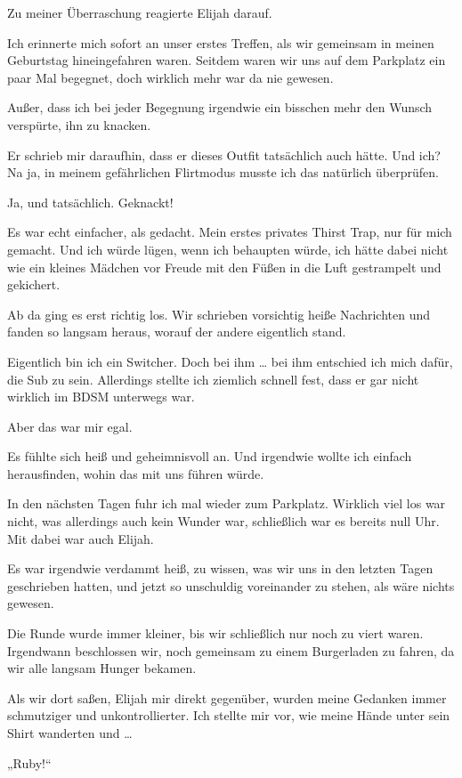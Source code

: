Zu meiner Überraschung reagierte Elijah darauf.

Ich erinnerte mich sofort an unser erstes Treffen, als wir gemeinsam in meinen Geburtstag hineingefahren waren. Seitdem waren wir uns auf dem Parkplatz ein paar Mal begegnet, doch wirklich mehr war da nie gewesen.

Außer, dass ich bei jeder Begegnung irgendwie ein bisschen mehr den Wunsch verspürte, ihn zu knacken.

Er schrieb mir daraufhin, dass er dieses Outfit tatsächlich auch hätte. Und ich? Na ja, in meinem gefährlichen Flirtmodus musste ich das natürlich überprüfen.

Ja, und tatsächlich. Geknackt!

Es war echt einfacher, als gedacht. Mein erstes privates Thirst Trap, nur für mich gemacht. Und ich würde lügen, wenn ich behaupten würde, ich hätte dabei nicht wie ein kleines Mädchen vor Freude mit den Füßen in die Luft gestrampelt und gekichert.

Ab da ging es erst richtig los. Wir schrieben vorsichtig heiße Nachrichten und fanden so langsam heraus, worauf der andere eigentlich stand.

Eigentlich bin ich ein Switcher. Doch bei ihm … bei ihm entschied ich mich dafür, die Sub zu sein. Allerdings stellte ich ziemlich schnell fest, dass er gar nicht wirklich im BDSM unterwegs war.

Aber das war mir egal.

Es fühlte sich heiß und geheimnisvoll an. Und irgendwie wollte ich einfach herausfinden, wohin das mit uns führen würde.


In den nächsten Tagen fuhr ich mal wieder zum Parkplatz. Wirklich viel los war nicht, was allerdings auch kein Wunder war, schließlich war es bereits null Uhr. Mit dabei war auch Elijah.

Es war irgendwie verdammt heiß, zu wissen, was wir uns in den letzten Tagen geschrieben hatten, und jetzt so unschuldig voreinander zu stehen, als wäre nichts gewesen.

Die Runde wurde immer kleiner, bis wir schließlich nur noch zu viert waren. Irgendwann beschlossen wir, noch gemeinsam zu einem Burgerladen zu fahren, da wir alle langsam Hunger bekamen.

Als wir dort saßen, Elijah mir direkt gegenüber, wurden meine Gedanken immer schmutziger und unkontrollierter. Ich stellte mir vor, wie meine Hände unter sein Shirt wanderten und …

„Ruby!“

